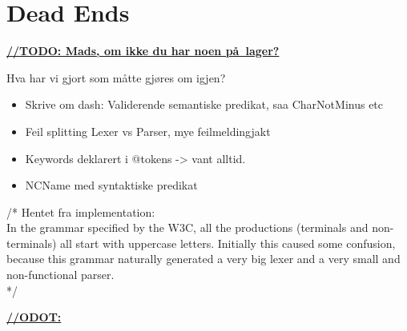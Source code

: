 \section{Dead Ends}
\label{sect:discussion:deadEnds}
\underline{\textbf{\LARGE //TODO: Mads, om ikke du har noen p\aa~lager?}}



Hva har vi gjort som m\aa tte gj\o res om igjen?

\begin{itemize}
\item Skrive om dash: Validerende semantiske predikat, saa CharNotMinus etc
\item Feil splitting Lexer vs Parser, mye feilmeldingjakt
\item Keywords deklarert i @tokens -> vant alltid.
\item NCName med syntaktiske predikat
\end{itemize}

/* Hentet fra implementation: \\
In the grammar specified by the W3C, all the productions (terminals and
non-terminals) all start with uppercase letters. Initially this caused some
confusion, because this grammar naturally generated a very big lexer and a very
small and non-functional parser. \\
*/

\underline{\textbf{\LARGE //ODOT:}}